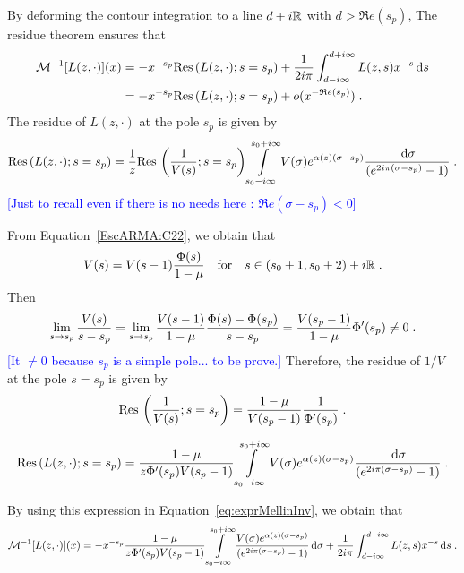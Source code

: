 \documentclass[11pt]{amsart}
\renewcommand{\Re}{\mathfrak{R}e}
\newcommand{\diff}{\,\mathrm{d}}
\newcommand{\ndr}[1]{\textcolor{blue}{[#1]}}
\newcommand{\res}{\mathrm{Res}\,}
\begin{document}
By deforming the contour integration to a line $d+i\mathbb{R}$ with $d > \Re(s_p)$, The residue theorem ensures that
\begin{subequations}
\begin{align}
    \Mcal^{-1}[L(z,\cdot)](x) 
    &= - x^{-s_p}\res(L(z,\cdot);s = s_p) +  \frac{1}{2i\pi} \int_{d-i\infty}^{d+i\infty} L(z,s)x^{-s}\diff s\\
    &= - x^{-s_p}\res(L(z,\cdot);s = s_p) + o(x^{-\Re(s_p)})
    \eqfinp
\end{align}
\label{eq:exprMellinInv}
\end{subequations}
The residue of $L(z,\cdot)$ at the pole $s_p$ is given by 
\begin{equation*}
    \res(L(z,\cdot);s = s_p) 
    = 
    \frac{1}{z}\res\left( \frac{1}{V(s)}; s = s_p\right) \int\limits_{s_0-i\infty}^{s_0+i\infty}
    V(\sigma) e^{ \alpha(z)(\sigma-s_p)}
   \frac{\diff \sigma}{(e^{2i\pi(\sigma-s_p)}-1)}
   \eqfinp
\end{equation*}
\ndr{Just to recall even if there is no needs here : $\Re(\sigma-s_p) < 0$}

From Equation~\eqref{EscARMA:C22}, we obtain that
$$ V(s) = V(s-1)\frac{\Phi(s)}{1-\mu}
        \quad \text{for} \quad
        s \in (s_0+1, s_0+2) + i\mathbb{R}
        \; .$$
Then 
$$ \lim_{s\to s_p} \frac{V(s)}{s-s_p} 
= \lim_{s\to s_p} \frac{V(s-1)}{1-\mu} \frac{\Phi(s)-\Phi(s_p)}{s-s_p}
=  \frac{V(s_p-1)}{1-\mu} \Phi'(s_p) \neq 0 \; .$$
\ndr{It $\neq 0$ because $s_p$ is a simple pole... to be prove.}
Therefore, the  residue of $1/V$ at the pole $s = s_p$ is given by 
$$ \res\left( \frac{1}{V(s)}; s = s_p\right) = \frac{1-\mu}{V(s_p-1)} \frac{1}{\Phi'(s_p)} \eqfinp$$

\begin{equation}
    \res(L(z,\cdot);s = s_p) 
    = 
     \frac{1-\mu}{z \Phi'(s_p) V(s_p-1)}
     \int\limits_{s_0-i\infty}^{s_0+i\infty}
    V(\sigma) e^{ \alpha(z)(\sigma-s_p)}
   \frac{\diff \sigma}{(e^{2i\pi(\sigma-s_p)}-1)}
   \eqfinp
\end{equation}

By using this expression in Equation~\eqref{eq:exprMellinInv}, we obtain that 
\begin{equation*}
    \Mcal^{-1}[L(z,\cdot)](x) 
    = - x^{-s_p}\frac{1-\mu}{z \Phi'(s_p) V(s_p-1)}
     \int\limits_{s_0-i\infty}^{s_0+i\infty}
     \frac{V(\sigma) e^{ \alpha(z)(\sigma-s_p)}
  }{(e^{2i\pi(\sigma-s_p)}-1)}\diff \sigma + \frac{1}{2i\pi} \int_{d-i\infty}^{d+i\infty} L(z,s)x^{-s}\diff s
    \eqfinp
\end{equation*}
\end{document}
